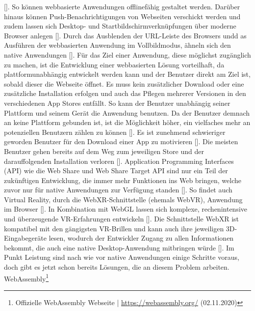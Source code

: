 \documentclass[a4paper,12pt,oneside]{article}
\begin{document}
        [\cite[2]{Ater2017}].
        So können webbasierte Anwendungen offlinefähig gestaltet werden. Darüber hinaus können
        Push-Benachrichtigungen von Webseiten verschickt werden und zudem lassen sich
        Desktop- und Startbildschirmverknüpfungen über moderne Browser anlegen [\cite[5-6]{Ater2017}].
        Durch das Ausblenden der URL-Leiste des Browsers
        undd as Ausführen der webbasierten Anwendung im Vollbildmodus, ähneln sich den
        native Anwendungen [\cite[6]{Ater2017}]. Für das Ziel einer Anwendung, diese
        möglichst zugänglich zu machen, ist die Entwicklung einer webbasierten Lösung
        vorteilhaft, da plattformunabhängig entwickelt werden kann und der
        Benutzer direkt am Ziel ist, sobald dieser die Webseite öffnet.
        Es muss kein zusätzlicher
        Download oder eine zusätzliche Installation erfolgen und auch das Pflegen mehrerer
        Versionen in den verschiedenen App Stores entfällt. So kann der Benutzer unabhängig
        seiner Plattform und seinem Gerät die Anwendung benutzen. Da der Benutzer 
        demnach an keine Plattform
        gebunden ist, ist die Möglichkeit höher, ein vielfaches mehr an potenziellen
        Benutzern zählen zu können [\cite[3]{Ater2017}].
        Es ist zunehmend schwieriger geworden Benutzer für den Download einer App 
        zu motivieren [\cite[3]{Ater2017}].
        Die meisten Benutzer gehen bereits auf dem Weg zum jeweiligen Store und der darauffolgenden
        Installation verloren [\cite[4]{Ater2017}]. Application Programming Interfaces (API) 
        wie die Web Share und Web Share Target
        API sind nur ein Teil der zukünftigen Entwicklung, die immer mehr Funktionen ins
        Web bringen, welche zuvor nur für native Anwendungen zur Verfügung standen [\cite[245]{Ater2017}].
        So findet auch Virtual Reality, durch die WebXR-Schnittstelle (ehemals WebVR),
        Anwendung im Browser [\cite[245]{Ater2017}]. In Kombination mit WebGL lassen sich komplexe,
        rechenintensive und überzeugende VR-Erfahrungen entwickeln [\cite[245]{Ater2017}].
        Die Schnittstelle WebXR ist kompatibel mit den gängigsten VR-Brillen und kann auch
        ihre jeweiligen 3D-Eingabegeräte lesen, wodurch der Entwickler Zugang zu allen Informationen
        bekommt, die auch eine native Desktop-Anwendung mitbringen würde [\cite[245]{Ater2017}].
        Im Punkt Leistung sind nach wie vor native Anwendungen einige Schritte voraus, doch
        gibt es jetzt schon bereits Lösungen, die an diesem Problem arbeiten. WebAssembly\footnote{Offizielle WebAssembly Webseite | \url{https://webassembly.org/} (02.11.2020)}
\end{document}
